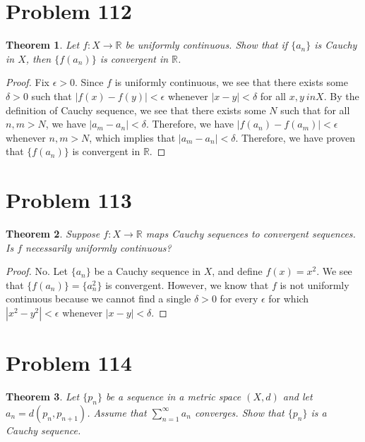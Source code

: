 \documentclass[psamsfonts]{amsart}
\newtheorem{thm}{Theorem}[section]
\theoremstyle{definition}
\theoremstyle{remark}
\numberwithin{equation}{section}
\begin{document}
\section{Problem 112}

\begin{thm}
Let $f: X \to \mathbb{R}$ be uniformly continuous. Show that if $\{ a_n \}$ is Cauchy in $X$, then $\{ f( a_n ) \}$ is convergent in $\mathbb{R}$. 
\end{thm}

\begin{proof}
Fix $\epsilon > 0$.  Since $f$ is uniformly continuous, we see that there exists some $\delta > 0$ such that $|f(x) - f(y)| < \epsilon$ whenever $|x-y| < \delta$ for all $x,y \ in X$. By the definition of Cauchy sequence, we see that there exists some $N$ such that for all $n,m > N$, we have $|a_m - a_n | < \delta$. Therefore, we have $|f(a_n) - f(a_m)| < \epsilon$ whenever $n,m > N$, which implies that $|a_m - a_n | < \delta$. Therefore, we have proven that $\{ f(a_n) \}$ is convergent in $\mathbb{R}$.
\end{proof}

\section{Problem 113}

\begin{thm}
Suppose $f: X \to \mathbb{R}$ maps Cauchy sequences to convergent sequences. Is $f$ necessarily uniformly continuous? 
\end{thm}

\begin{proof}
No. Let $\{ a_n \}$ be a Cauchy sequence in $X$, and define $f(x) = x^2$. We see that $\{ f(a_n) \} = \{ a_n^2 \}$ is convergent. However, we know that $f$ is not uniformly continuous because we cannot find a single $\delta > 0$ for every $\epsilon$ for which $|x^2 - y^2 | < \epsilon$ whenever $|x-y| < \delta$. 
\end{proof}

\section{Problem 114}

\begin{thm}
Let $\{ p_n \}$ be a sequence in a metric space $(X,d)$ and let $a_n = d(p_n,p_{n+1})$. Assume that $\sum_{n=1}^\infty a_n$ converges. Show that $\{ p_n \}$ is a Cauchy sequence.
\end{thm}
\end{document}
